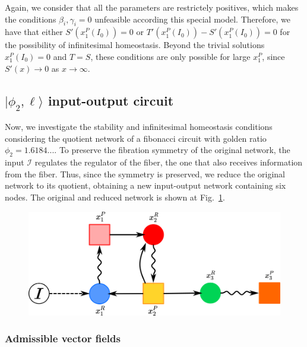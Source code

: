 Again, we consider that all the parameters are restrictely 
positives, which makes the conditions $\beta_i, \gamma_i = 0$
unfeasible according this special model. Therefore, we have that 
either $S'(x_1^P(I_0)) = 0$ or $T'(x_1^P(I_0)) - S'(x_1^P(I_0)) = 0$
for the possibility of infinitesimal homeostasis. Beyond the 
trivial solutions $x_1^P(I_0) = 0$ and $T = S$, these conditions 
are only possible for large $x_1^P$, since $S'(x) \rightarrow 0$ 
as $x \rightarrow \infty$. 

\subsection{$|\phi_2, \ell \rangle$ input-output circuit}

Now, we investigate the stability and infinitesimal homeostasis 
conditions considering the quotient network of a fibonacci circuit 
with golden ratio $\phi_2 = 1.6184...$. To preserve the fibration 
symmetry of the original network, the input $\mathcal{I}$ regulates 
the regulator of the fiber, the one that also receives information 
from the fiber. Thus, since the symmetry is preserved, we reduce 
the original network to its quotient, obtaining a new input-output
network containing six nodes. The original and reduced network is 
shown at Fig.~\ref{fig:fibo_quot}.

\begin{figure}[H]
    \centering
    \includegraphics[scale=0.5]{figs/quotient_fibo_1.png}
    \caption{}
    \label{fig:fibo_quot}
\end{figure}


\subsubsection{Admissible vector fields}

